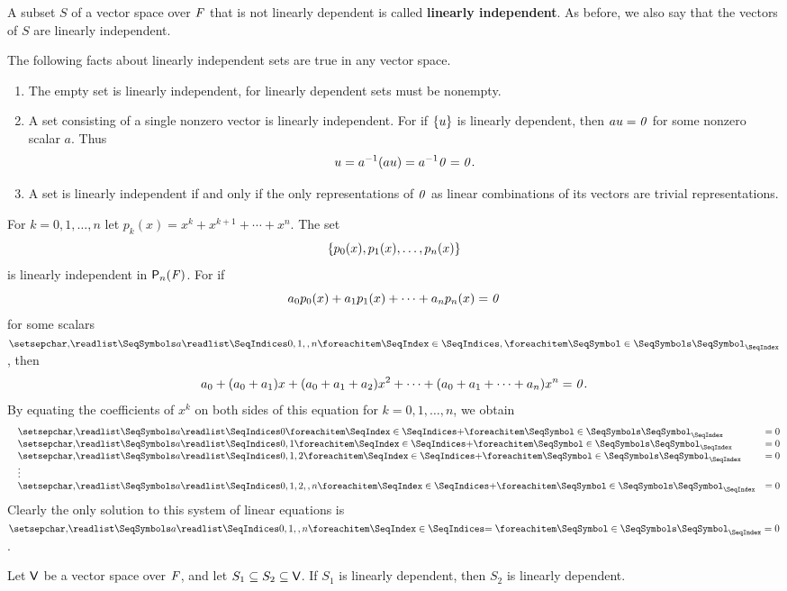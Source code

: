 \begin{defn}\label{1.5.3}
  A subset \(S\) of a vector space over \(\mathit{F}\) that is not linearly dependent is called \textbf{linearly independent}.
  As before, we also say that the vectors of \(S\) are linearly independent.
\end{defn}

\begin{eg}\label{1.5.4}
  The following facts about linearly independent sets are true in any vector space.
  \begin{enumerate}
    \item The empty set is linearly independent, for linearly dependent sets must be nonempty.
    \item A set consisting of a single nonzero vector is linearly independent.
          For if \(\left\lbrace u\right\rbrace\) is linearly dependent, then \(au = \mathit{0}\) for some nonzero scalar \(a\).
          Thus
          \[
            u = a^{-1} (au) = a^{-1} \mathit{0} = \mathit{0}.
          \]
    \item A set is linearly independent if and only if the only representations of \(\mathit{0}\) as linear combinations of its vectors are trivial representations.
  \end{enumerate}
\end{eg}

\begin{eg}\label{1.5.5}
  For \(k = 0, 1, \dots, n\) let \(p_k(x) = x^k + x^{k + 1} + \cdots + x^n\).
  The set
  \[
    \left\lbrace p_0(x), p_1(x), \dots, p_n(x)\right\rbrace
  \]
  is linearly independent in \(\ps[n]{\F}\).
  For if
  \[
    a_0 p_0(x) + a_1 p_1(x) + \cdots + a_n p_n(x) = \mathit{0}
  \]
  for some scalars \(\seq{a}{0,1,,n}\), then
  \[
    a_0 + (a_0 + a_1) x + (a_0 + a_1 + a_2) x^2 + \cdots + (a_0 + a_1 + \cdots + a_n) x^n = \mathit{0}.
  \]
  By equating the coefficients of \(x^k\) on both sides of this equation for \(k = 0, 1, \dots, n\), we obtain
  \[
    \begin{matrix*}[l]
      & \seq[+]{a}{0}      & = 0 \\
      & \seq[+]{a}{0,1}    & = 0 \\
      & \seq[+]{a}{0,1,2}  & = 0 \\
      & \vdots & \\
      & \seq[+]{a}{0,1,2,,n} & = 0
    \end{matrix*}
  \]
  Clearly the only solution to this system of linear equations is \(\seq[=]{a}{0,1,,n} = 0\).
\end{eg}

\begin{thm}\label{1.6}
  Let \(\mathsf{V}\) be a vector space over \(\mathit{F}\), and let \(S_1 \subseteq S_2 \subseteq \mathsf{V}\).
  If \(S_1\) is linearly dependent, then \(S_2\) is linearly dependent.
\end{thm}

